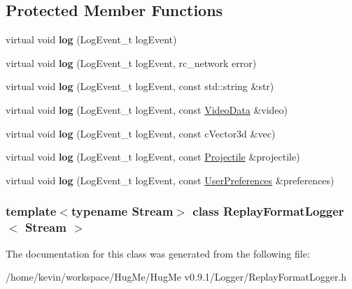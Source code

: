 \subsection*{Protected Member Functions}
\begin{DoxyCompactItemize}
\item 
\hypertarget{classReplayFormatLogger_a18bcc32caf1d4834b9658819c45617bb}{
virtual void {\bfseries log} (LogEvent\_\-t logEvent)}
\label{classReplayFormatLogger_a18bcc32caf1d4834b9658819c45617bb}

\item 
\hypertarget{classReplayFormatLogger_aad5d2ca1b6527bda0a773a703d455707}{
virtual void {\bfseries log} (LogEvent\_\-t logEvent, rc\_\-network error)}
\label{classReplayFormatLogger_aad5d2ca1b6527bda0a773a703d455707}

\item 
\hypertarget{classReplayFormatLogger_a09c2b70d4bab8a8dce7cd0fcf98ff00f}{
virtual void {\bfseries log} (LogEvent\_\-t logEvent, const std::string \&str)}
\label{classReplayFormatLogger_a09c2b70d4bab8a8dce7cd0fcf98ff00f}

\item 
\hypertarget{classReplayFormatLogger_aac110cbc4ab5d99abe42f83a3b665d23}{
virtual void {\bfseries log} (LogEvent\_\-t logEvent, const \hyperlink{structVideoData}{VideoData} \&video)}
\label{classReplayFormatLogger_aac110cbc4ab5d99abe42f83a3b665d23}

\item 
\hypertarget{classReplayFormatLogger_afb7d48668573d253ce0a40668897dd2d}{
virtual void {\bfseries log} (LogEvent\_\-t logEvent, const cVector3d \&vec)}
\label{classReplayFormatLogger_afb7d48668573d253ce0a40668897dd2d}

\item 
\hypertarget{classReplayFormatLogger_a7ea8b69c839d2e6da78da5637f3852bd}{
virtual void {\bfseries log} (LogEvent\_\-t logEvent, const \hyperlink{classProjectile}{Projectile} \&projectile)}
\label{classReplayFormatLogger_a7ea8b69c839d2e6da78da5637f3852bd}

\item 
\hypertarget{classReplayFormatLogger_ac024c64378af6a0e146b6cfc29d3cc63}{
virtual void {\bfseries log} (LogEvent\_\-t logEvent, const \hyperlink{structUserPreferences}{UserPreferences} \&preferences)}
\label{classReplayFormatLogger_ac024c64378af6a0e146b6cfc29d3cc63}

\end{DoxyCompactItemize}
\subsubsection*{template$<$typename Stream$>$ class ReplayFormatLogger$<$ Stream $>$}



The documentation for this class was generated from the following file:\begin{DoxyCompactItemize}
\item 
/home/kevin/workspace/HugMe/HugMe v0.9.1/Logger/ReplayFormatLogger.h\end{DoxyCompactItemize}
